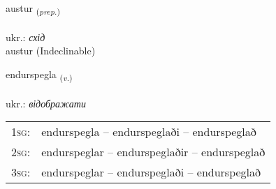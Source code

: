 \documentclass[frontgrid, backgrid]{flacards}\usepackage[]{graphicx}\usepackage[]{xcolor}
\begin{document}

\renewcommand{\flhead}{\vskip5pt \fboxsep=0pt {\small\bfseries\footnotesize Forsetning | прийменник}}
\renewcommand{\fcfoot}{\vskip5pt \fboxsep=0pt \hspace{2pt}{\small\bfseries\footnotesize 2K}}

\renewcommand{\blhead}{\vskip5pt {\small\bfseries\footnotesize Forsetning | прийменник }}
\renewcommand{\bcfoot}{\vskip5pt \hspace{2pt}{\small\bfseries\footnotesize 2K}}


{austur \small{\textsubscript{(\textit{prep.})}} \\[1ex]
\textphonetic{[œistʏr]} \\
ukr.: \emph{схід} \\  [2ex]
austur (Indeclinable)}

\renewcommand{\flhead}{\vskip5pt \fboxsep=0pt {\small\bfseries\footnotesize Sagnorð | дієслово}}
\renewcommand{\fcfoot}{\vskip5pt \fboxsep=0pt \hspace{2pt}{\small\bfseries\footnotesize 2K}}

\renewcommand{\blhead}{\vskip5pt {\small\bfseries\footnotesize Sagnorð | дієслово }}
\renewcommand{\bcfoot}{\vskip5pt \hspace{2pt}{\small\bfseries\footnotesize 2K}}


{endurspegla \small{\textsubscript{(\textit{v.})}} \\[1ex] %
 \\
ukr.: \emph{відображати} \\  [2ex]
\renewcommand*{\arraystretch}{0.8}
\begin{tabular}{p{1cm}l}
\textsc{1sg}: & endurspegla -- endurspeglaði -- endurspeglað \\ 
\textsc{2sg}: & endurspeglar -- endurspeglaðir -- endurspeglað \\ 
\textsc{3sg}: & endurspeglar -- endurspeglaði -- endurspeglað \\ 
\end{tabular}
}
\end{document}
